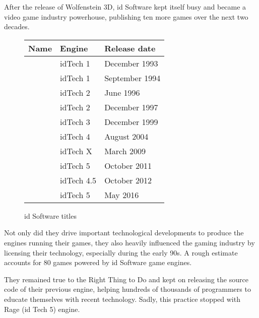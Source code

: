 After the release of Wolfenstein 3D, id Software kept itself busy and became a video game industry powerhouse, publishing ten more games over the next two decades. 
 \begin{figure}[H]
\centering  
\begin{tabularx}{\textwidth}{ X  Y Y }
  \toprule
  \textbf{Name} & \textbf{Engine}  & \textbf{Release date} \\
  \toprule {}\protect\footnotemark & idTech 1 & December 1993 \\ 
            & idTech 1 & September 1994 \\ 
            & idTech 2 &June 1996 \\ 
            & idTech 2 & December 1997 \\ 
            &  idTech 3 & December 1999 \\ 
            &  idTech 4 & August 2004 \\ 
            &  idTech X & March 2009 \\ 
            &  idTech 5 & October 2011 \\ 
            &  idTech 4.5 & October 2012 \\ 
            &  idTech 5 & May 2016 \\ 
  \toprule
\end{tabularx}
\caption{id Software titles}\label{fig:vga_history}
\end{figure}
\par
Not only did they drive important technological developments to produce the engines running their games, they also heavily influenced the gaming industry by licensing their technology, especially during the early 90s. A rough estimate accounts for 80 games powered by id Software game engines.\\
\par
They remained true to the Right Thing to Do and kept on releasing the source code of their previous engine, helping hundreds of thousands of programmers to educate themselves with recent technology. Sadly, this practice stopped with Rage (id Tech 5) engine.
\par
